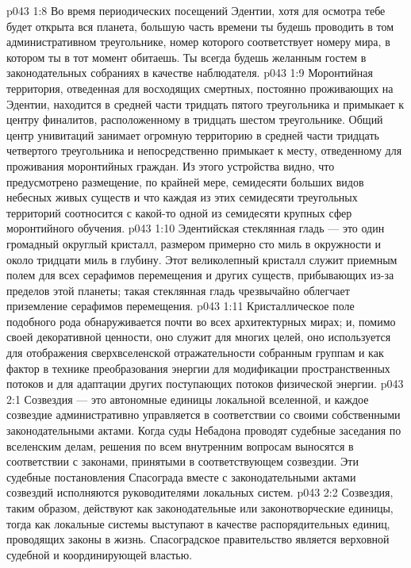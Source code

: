 \vs p043 1:8 Во время периодических посещений Эдентии, хотя для осмотра тебе будет открыта вся планета, большую часть времени ты будешь проводить в том административном треугольнике, номер которого соответствует номеру мира, в котором ты в тот момент обитаешь. Ты всегда будешь желанным гостем в законодательных собраниях в качестве наблюдателя.
\vs p043 1:9 Моронтийная территория, отведенная для восходящих смертных, постоянно проживающих на Эдентии, находится в средней части тридцать пятого треугольника и примыкает к центру финалитов, расположенному в тридцать шестом треугольнике. Общий центр унивитаций занимает огромную территорию в средней части тридцать четвертого треугольника и непосредственно примыкает к месту, отведенному для проживания моронтийных граждан. Из этого устройства видно, что предусмотрено размещение, по крайней мере, семидесяти больших видов небесных живых существ и что каждая из этих семидесяти треугольных территорий соотносится с какой\hyp{}то одной из семидесяти крупных сфер моронтийного обучения.
\vs p043 1:10 Эдентийская стеклянная гладь --- это один громадный округлый кристалл, размером примерно сто миль в окружности и около тридцати миль в глубину. Этот великолепный кристалл служит приемным полем для всех серафимов перемещения и других существ, прибывающих из\hyp{}за пределов этой планеты; такая стеклянная гладь чрезвычайно облегчает приземление серафимов перемещения.
\vs p043 1:11 Кристаллическое поле подобного рода обнаруживается почти во всех архитектурных мирах; и, помимо своей декоративной ценности, оно служит для многих целей, оно используется для отображения сверхвселенской отражательности собранным группам и как фактор в технике преобразования энергии для модификации пространственных потоков и для адаптации других поступающих потоков физической энергии.
\vs p043 2:1 Созвездия --- это автономные единицы локальной вселенной, и каждое созвездие административно управляется в соответствии со своими собственными законодательными актами. Когда суды Небадона проводят судебные заседания по вселенским делам, решения по всем внутренним вопросам выносятся в соответствии с законами, принятыми в соответствующем созвездии. Эти судебные постановления Спасограда вместе с законодательными актами созвездий исполняются руководителями локальных систем.
\vs p043 2:2 Созвездия, таким образом, действуют как законодательные или законотворческие единицы, тогда как локальные системы выступают в качестве распорядительных единиц, проводящих законы в жизнь. Спасоградское правительство является верховной судебной и координирующей властью.

